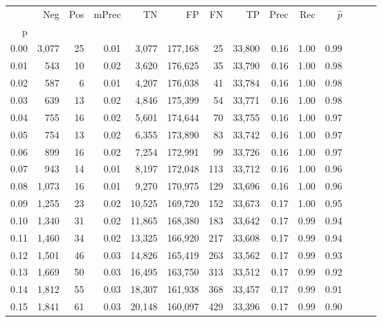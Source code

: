 \begin{tabular}{rrrrrrrrrrrrrr}
\toprule
{} &    Neg &  Pos & mPrec &       TN &       FP &      FN &      TP &  Prec &   Rec & $\hat{p}$ \\
p    &        &      &       &          &          &         &         &       &       &           \\
\midrule
0.00 &  3,077 &   25 &  0.01 &    3,077 &  177,168 &      25 &  33,800 &  0.16 &  1.00 &      0.99 \\
0.01 &    543 &   10 &  0.02 &    3,620 &  176,625 &      35 &  33,790 &  0.16 &  1.00 &      0.98 \\
0.02 &    587 &    6 &  0.01 &    4,207 &  176,038 &      41 &  33,784 &  0.16 &  1.00 &      0.98 \\
0.03 &    639 &   13 &  0.02 &    4,846 &  175,399 &      54 &  33,771 &  0.16 &  1.00 &      0.98 \\
0.04 &    755 &   16 &  0.02 &    5,601 &  174,644 &      70 &  33,755 &  0.16 &  1.00 &      0.97 \\
0.05 &    754 &   13 &  0.02 &    6,355 &  173,890 &      83 &  33,742 &  0.16 &  1.00 &      0.97 \\
0.06 &    899 &   16 &  0.02 &    7,254 &  172,991 &      99 &  33,726 &  0.16 &  1.00 &      0.97 \\
0.07 &    943 &   14 &  0.01 &    8,197 &  172,048 &     113 &  33,712 &  0.16 &  1.00 &      0.96 \\
0.08 &  1,073 &   16 &  0.01 &    9,270 &  170,975 &     129 &  33,696 &  0.16 &  1.00 &      0.96 \\
0.09 &  1,255 &   23 &  0.02 &   10,525 &  169,720 &     152 &  33,673 &  0.17 &  1.00 &      0.95 \\
0.10 &  1,340 &   31 &  0.02 &   11,865 &  168,380 &     183 &  33,642 &  0.17 &  0.99 &      0.94 \\
0.11 &  1,460 &   34 &  0.02 &   13,325 &  166,920 &     217 &  33,608 &  0.17 &  0.99 &      0.94 \\
0.12 &  1,501 &   46 &  0.03 &   14,826 &  165,419 &     263 &  33,562 &  0.17 &  0.99 &      0.93 \\
0.13 &  1,669 &   50 &  0.03 &   16,495 &  163,750 &     313 &  33,512 &  0.17 &  0.99 &      0.92 \\
0.14 &  1,812 &   55 &  0.03 &   18,307 &  161,938 &     368 &  33,457 &  0.17 &  0.99 &      0.91 \\
0.15 &  1,841 &   61 &  0.03 &   20,148 &  160,097 &     429 &  33,396 &  0.17 &  0.99 &      0.90 \\

\end{tabular}
